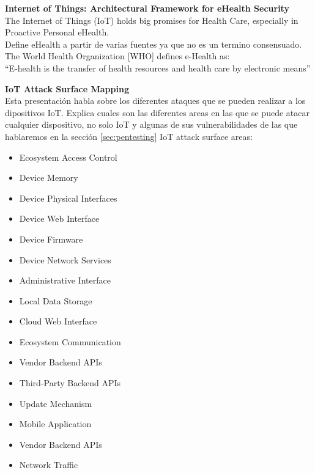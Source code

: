\textbf{Internet of Things: Architectural Framework	for eHealth Security}\cite{Paper8}\\
The Internet of Things (IoT) holds big promises for Health Care, especially in Proactive Personal eHealth.\\
Define eHealth a partir de varias fuentes ya que no es un termino consensuado.
The World Health Organization [WHO] defines e-Health as:\\
``E-health is the transfer of health resources and health care by electronic means''

\textbf{IoT Attack Surface Mapping}\cite{Presentation1}\\
Esta presentación habla sobre los diferentes ataques que se pueden realizar a los dipositivos IoT.
Explica cuales son las diferentes areas en las que se puede atacar cualquier dispositivo, no solo IoT y algunas de sus vulnerabilidades de las que hablaremos en la sección \ref{sec:pentesting}
IoT attack surface areas:
\begin{itemize}
	\item Ecosystem Access Control
	\item Device Memory
	\item Device Physical Interfaces
	\item Device Web Interface
	\item Device Firmware
	\item Device Network Services
	\item Administrative Interface
	\item Local Data Storage
	\item Cloud Web Interface
	\item Ecosystem Communication
	\item Vendor Backend APIs
	\item Third-Party Backend APIs
	\item Update Mechanism
	\item Mobile Application
	\item Vendor Backend APIs
	\item Network Traffic
\end{itemize}

